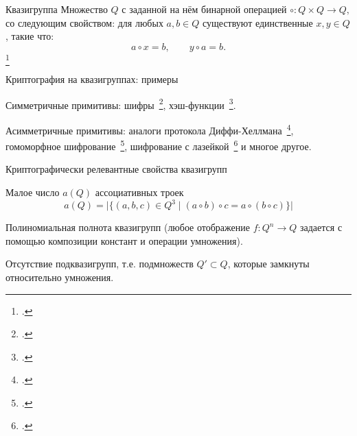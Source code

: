 

\begin{frame}
    \begin{myexample}{Квазигруппа}
        Множество $Q$ с заданной на нём бинарной операцией
        \(
          \circ \colon Q \times Q \to Q, 
        \)
        со следующим свойством: для любых $a, b \in Q$ существуют единственные $x, y \in Q$, такие что:
        \[
          a \circ x = b, \qquad y \circ a = b.
        \]
        \footcitetext{belousov, keedwell}
    \end{myexample}
\end{frame}


\begin{frame}{Криптография на квазигруппах: примеры}
    \begin{coloritemize}
        \item Симметричные примитивы: шифры~\footcite{inru, edon80}, хэш-функции~\footcite{EdonR, EdonRprime}.
        \pause 
        \item Асимметричные примитивы: аналоги протокола Диффи-Хеллмана~\footcite{katyshev14}, гомоморфное шифрование~\footcite{gribov2010construction, markov20}, шифрование с лазейкой~\footcite{gligoroski2008public, chen2010multivariate, gligoroski2011mqq} и многое другое.
    \end{coloritemize}
\end{frame}


\begin{frame}{Криптографически релевантные свойства квазигрупп}
    \begin{coloritemize}
        \item Малое число $a(Q)$ ассоциативных троек
        \[
            a(Q) = \lvert \{ (a, b, c) \in Q^3 \mid (a \circ b) \circ c = a \circ (b \circ c) \} \rvert
        \]
        \pause 
        \item Полиномиальная полнота квазигрупп (любое отображение $f \colon Q^n \to Q$ задается с помощью композиции констант и операции умножения).
        \pause
        \item Отсутствие подквазигрупп, т.е. подмножеств $Q' \subset Q$, которые замкнуты относительно умножения.
    \end{coloritemize}
\end{frame}


